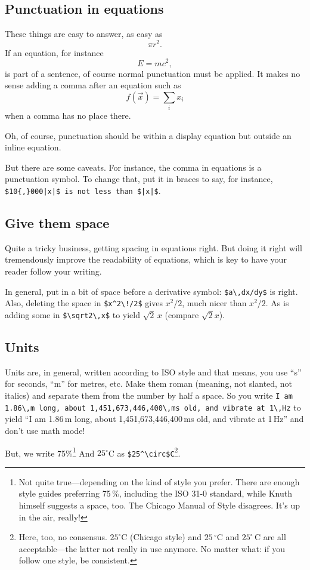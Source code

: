 \documentclass{article}
\begin{document}
\subsection{Punctuation in equations}

These things are easy to answer, as easy as
$$ \pi r^2.$$
If an equation, for instance
$$ E = m c^2, $$
is part of a sentence, of course normal punctuation must be applied.  It makes no sense adding a comma after an equation such as 
$$ f(\vec x) = \sum_i x_i $$
when a comma has no place there.

Oh, of course, punctuation should be within a display equation but outside an inline equation.

But there are some caveats.  For instance, the comma in equations is a punctuation symbol. To change that, put it in braces to say, for instance, \verb+$10{,}000|x|$ is not less than $|x|$+.

\subsection{Give them space}
Quite a tricky business, getting spacing in equations right.  But doing it right will tremendously improve the readability of equations, which is key to have your reader follow your writing.

In general, put in a bit of space before a derivative symbol: \verb+$a\,dx/dy$+ is right. Also, deleting the space in \verb+$x^2\!/2$+ gives $x^2\!/2$, much nicer than $x^2/2$. As is adding some in \verb+$\sqrt2\,x$+ to yield $\sqrt2\,x$ (compare $\sqrt2x$).

\subsection{Units}
Units are, in general, written according to ISO style and that means, you use ``s'' for seconds, ``m'' for metres, etc.  Make them roman (meaning, not slanted, not italics) and separate them from the number by half a space.  So you write \texttt{I am }\verb+1.86\,m+\texttt{ long, about }\verb+1,451,673,446,400\,ms+\texttt{ old, and vibrate at }\verb+1\,Hz+ to yield ``I am 1.86\,m long, about 1,451,673,446,400\,ms old, and vibrate at 1\,Hz'' and don't use math mode!  

But, we write 75\%\footnote{Not quite true---depending on the kind of style you prefer.  There are enough style guides preferring 75\,\%, including the ISO 31-0 standard, while Knuth himself suggests a space, too.  The Chicago Manual of Style disagrees.  It's up in the air, really!} And $25^\circ$C as \verb+$25^\circ$C+\footnote{Here, too, no consensus.  $25^\circ$C (Chicago style) and $25\,^\circ$C and $25^\circ\,$C are all acceptable---the latter not really in use anymore.  No matter what: if you follow one style, be consistent.}.
\end{document}
